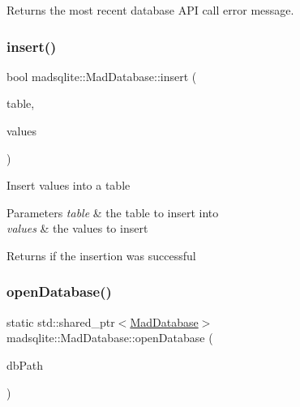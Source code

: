 \begin{DoxyReturn}{Returns}
the most recent database A\+PI call error message. 
\end{DoxyReturn}
\hypertarget{classmadsqlite_1_1_mad_database_a9383a29a4411d29a5345cd233e32756d}{}\label{classmadsqlite_1_1_mad_database_a9383a29a4411d29a5345cd233e32756d} 
\subsubsection{\texorpdfstring{insert()}{insert()}}
{\footnotesize\ttfamily bool madsqlite\+::\+Mad\+Database\+::insert (\begin{DoxyParamCaption}\item[{std\+::string const \&}]{table,  }\item[{\hyperlink{classmadsqlite_1_1_mad_content_values}{Mad\+Content\+Values} \&}]{values }\end{DoxyParamCaption})}

Insert values into a table


\begin{DoxyParams}{Parameters}
{\em table} & the table to insert into \\
\hline
{\em values} & the values to insert \\
\hline
\end{DoxyParams}
\begin{DoxyReturn}{Returns}
if the insertion was successful 
\end{DoxyReturn}
\hypertarget{classmadsqlite_1_1_mad_database_a68c5b61e4cf000f4947f9c43a2c12338}{}\label{classmadsqlite_1_1_mad_database_a68c5b61e4cf000f4947f9c43a2c12338} 
\subsubsection{\texorpdfstring{open\+Database()}{openDatabase()}}
{\footnotesize\ttfamily static std\+::shared\+\_\+ptr$<$\hyperlink{classmadsqlite_1_1_mad_database}{Mad\+Database}$>$ madsqlite\+::\+Mad\+Database\+::open\+Database (\begin{DoxyParamCaption}\item[{std\+::string const \&}]{db\+Path }\end{DoxyParamCaption})\hspace{0.3cm}{\ttfamily [static]}}

